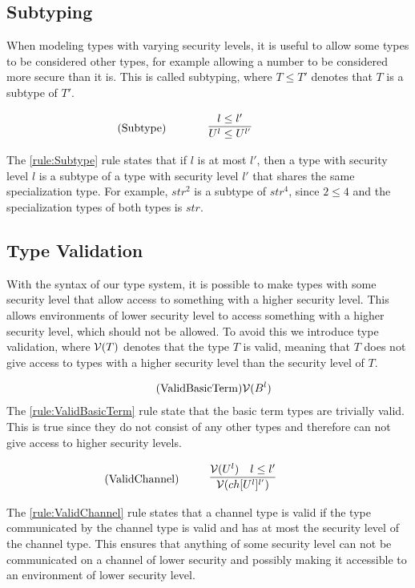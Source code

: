\subsection{Subtyping}
When modeling types with varying security levels, it is useful to allow some types to be considered other types, for example allowing a number to be considered more secure than it is.
This is called subtyping, where $T\leq T'$ denotes that $T$ is a subtype of $T'$. 

\begin{align*}
\tag{Subtype}\label{rule:Subtype} &\infrule{l\leq l'}{U^l\leq U^{l'}}
\end{align*}
The \ref{rule:Subtype} rule states that if $l$ is at most $l'$, then a type with security level $l$ is a subtype of a type with security level $l'$ that shares the same specialization type.
For example, $str^2$ is a subtype of $str^4$, since $2\leq4$ and the specialization types of both types is $str$.

\subsection{Type Validation}
With the syntax of our type system, it is possible to make types with some security level that allow access to something with a higher security level.
This allows environments of lower security level to access something with a higher security level, which should not be allowed.
To avoid this we introduce type validation, where $\mathcal{V}(T)$ denotes that the type $T$ is valid, meaning that $T$ does not give access to types with a higher security level than the security level of $T$.

\begin{align*}
\tag{ValidBasicTerm}\label{rule:ValidBasicTerm} &\mathcal{V}(B^l)
\end{align*}
The \ref{rule:ValidBasicTerm} rule state that the basic term types are trivially valid.
This is true since they do not consist of any other types and therefore can not give access to higher security levels.

\begin{align*}
\tag{ValidChannel}\label{rule:ValidChannel} &\infrule{\valid{U^l}\quad l\leq l'}{\valid{ch[U^l]^{l'}}}
\end{align*}
The \ref{rule:ValidChannel} rule states that a channel type is valid if the type communicated by the channel type is valid and has at most the security level of the channel type.
This ensures that anything of some security level can not be communicated on a channel of lower security and possibly making it accessible to an environment of lower security level.

